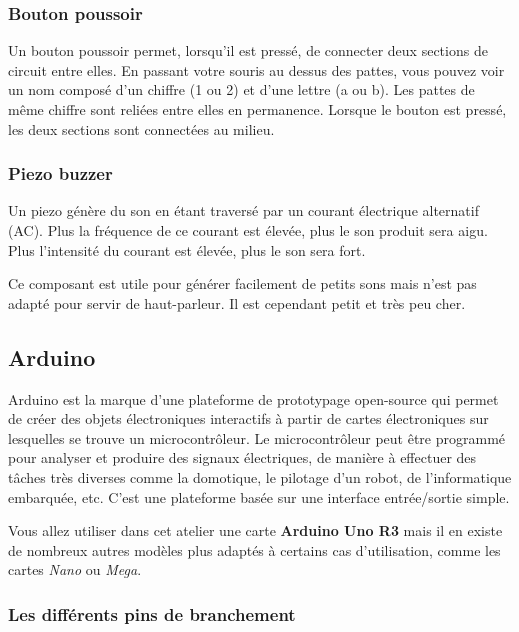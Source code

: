 \subsubsection{Bouton poussoir}

Un bouton poussoir permet, lorsqu'il est pressé, de connecter deux sections de circuit entre elles.
En passant votre souris au dessus des pattes, vous pouvez voir un nom composé d'un chiffre (1 ou 2) et d'une lettre (a ou b).
Les pattes de même chiffre sont reliées entre elles en permanence.
Lorsque le bouton est pressé, les deux sections sont connectées au milieu.


\subsubsection{Piezo buzzer}

Un piezo génère du son en étant traversé par un courant électrique alternatif (AC).
Plus la fréquence de ce courant est élevée, plus le son produit sera aigu.
Plus l'intensité du courant est élevée, plus le son sera fort.

Ce composant est utile pour générer facilement de petits sons mais n'est pas adapté pour servir de haut-parleur.
Il est cependant petit et très peu cher.



\clearpage
\subsection{Arduino}

Arduino est la marque d'une plateforme de prototypage open-source qui permet de créer des objets électroniques interactifs à partir de cartes électroniques sur lesquelles se trouve un microcontrôleur.
Le microcontrôleur peut être programmé pour analyser et produire des signaux électriques, de manière à effectuer des tâches très diverses comme la domotique, le pilotage d'un robot, de l'informatique embarquée, etc.
C'est une plateforme basée sur une interface entrée/sortie simple.

Vous allez utiliser dans cet atelier une carte \textbf{Arduino Uno R3} mais il en existe de nombreux autres modèles plus adaptés à certains cas d'utilisation, comme les cartes \textit{Nano} ou \textit{Mega}.

\subsubsection{Les différents pins de branchement}

